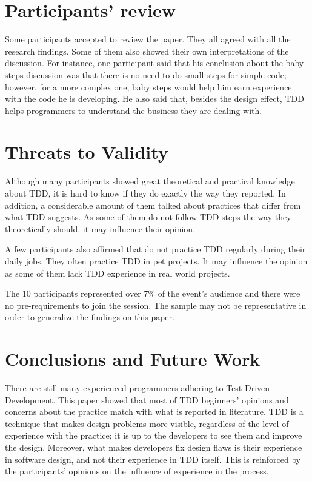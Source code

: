 \section{Participants' review}
\label{sec:review}

Some participants accepted to review the paper. They all agreed with all
the research findings. 
Some of them also showed their own interpretations of the discussion. For
instance, one participant said that his conclusion about the baby steps discussion was
that there is no need to do small steps for simple code; however, for a more
complex one, baby steps would help him earn experience with the code he is
developing. He also said that, besides the design effect, TDD helps programmers
to understand the business they are dealing with.

\section{Threats to Validity}
\label{sec:threats-to-validity}

Although many participants showed great theoretical and practical knowledge
about TDD, it is hard to know if they do exactly the way they reported.
In addition, a considerable amount of them talked about practices that differ
from what TDD suggests.
As some of them do not follow TDD steps the way they theoretically should, it
may influence their opinion.

A few participants also affirmed that do not practice TDD regularly during their
daily jobs. They often practice TDD in pet projects. It may influence the
opinion as some of them lack TDD experience in real world projects.

The 10 participants represented over 7\% of the event's audience and there were
no pre-requirements to join the session. The sample may not be representative in
order to generalize the findings on this paper.

\section{Conclusions and Future Work}

There are still many experienced programmers adhering to Test-Driven
Development. This paper showed that most of TDD beginners' opinions and concerns
about the practice match with what is reported in literature. 
TDD is a technique that makes design problems more visible, regardless of the
level of experience with the practice; it is up to the developers to see them
and improve the design. Moreover, what makes developers fix design flaws is
their experience in software design, and not their experience in TDD itself. 
This is reinforced by the participants' opinions on the influence of experience
in the process.

